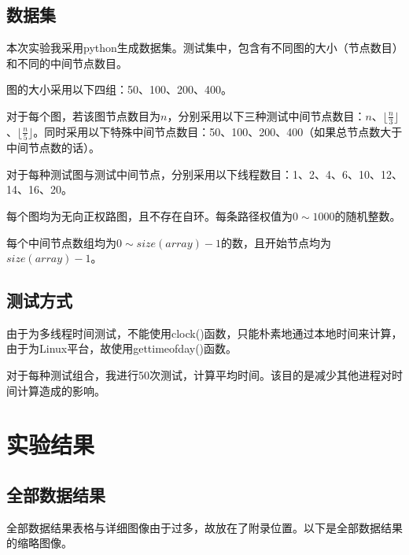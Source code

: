 \documentclass[UTF8]{ctexart}
\begin{document}
\subsection{数据集}
本次实验我采用python生成数据集。测试集中，包含有不同图的大小（节点数目）和不同的中间节点数目。

图的大小采用以下四组：50、100、200、400。

对于每个图，若该图节点数目为$n$，分别采用以下三种测试中间节点数目：$n$、$\lfloor \frac{n}{3} \rfloor$、$\lfloor \frac{n}{5} \rfloor$。同时采用以下特殊中间节点数目：50、100、200、400（如果总节点数大于中间节点数的话）。

对于每种测试图与测试中间节点，分别采用以下线程数目：1、2、4、6、10、12、14、16、20。

每个图均为无向正权路图，且不存在自环。每条路径权值为$0 \sim 1000$的随机整数。

每个中间节点数组均为$0 \sim size(array)-1$的数，且开始节点均为$size(array)-1$。
\subsection{测试方式}
由于为多线程时间测试，不能使用clock()函数，只能朴素地通过本地时间来计算，由于为Linux平台，故使用gettimeofday()函数。

对于每种测试组合，我进行50次测试，计算平均时间。该目的是减少其他进程对时间计算造成的影响。

\section{实验结果}
\subsection{全部数据结果}
全部数据结果表格与详细图像由于过多，故放在了附录位置。以下是全部数据结果的缩略图像。
\end{document}
